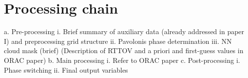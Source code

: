 \section{Processing chain}\label{processing_chain}

a. Pre-processing
i. Brief summary of auxiliary data (already addressed in paper I) and preprocessing grid structure
ii. Pavolonis phase determination
iii. NN cloud mask (brief)
(Description of RTTOV and a priori and first-guess values in ORAC paper)
b. Main processing
i. Refer to ORAC paper
c. Post-processing
i. Phase switching
ii. Final output variables

